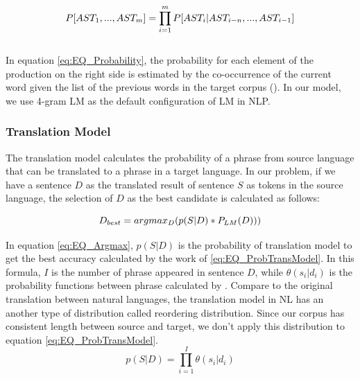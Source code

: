 \begin{equation} 
\small
\label{eq:EQ_Probability}
 P[AST_{1}, ...,AST_{m}]=\prod_{i=1}^{m}P[AST_{i} | AST_{i-n},...,AST_{i-1}]
\end{equation}
\\

In equation \ref{eq:EQ_Probability}, the probability for each element of the production on the right side is estimated by the co-occurrence of the current word given the list of the previous words in the target corpus (\cite{Jurafsky:2009:SLP:1214993}). In our model, we use 4-gram LM as the default configuration of LM in NLP.

\subsubsection{Translation Model}
The translation model calculates the probability of a phrase from source language that can be translated to a phrase in a target language. In our problem, if we have a sentence   \({D}\) as the translated result of sentence \({S}\) as tokens in the source language, the selection of \({D}\) as the best candidate is calculated as follows:

\begin{equation} 
\small
\label{eq:EQ_Argmax}
 D_{best}=argmax_{D}(p(S|D)*P_{LM}(D)))
\end{equation}

In equation \ref{eq:EQ_Argmax}, \({p(S|D)}\) is the probability of translation model to get the best accuracy calculated by the work of \ref{eq:EQ_ProbTransModel}. In this formula, \(I\) is the number of phrase appeared in sentence \({D}\), while \(\theta ({s_{i}}|{d_{i}})\) is the probability functions between phrase calculated by \cite{Green2014}. Compare to the original translation between natural languages, the translation model in NL has an another type of distribution called reordering distribution. Since our corpus has consistent length between source and target, we don't apply this distribution to equation \ref{eq:EQ_ProbTransModel}.
\begin{equation} 
\label{eq:EQ_ProbTransModel}
{p(S|D)=\prod_{i=1}^{I} \theta ({s_{i}}|{d_{i}}) }
\end{equation}


